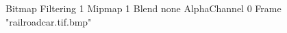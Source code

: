 {Bitmap
	{Filtering 1}
	{Mipmap 1}
	{Blend none}
	{AlphaChannel 0}
	{Frame "railroadcar.tif.bmp"}
}
